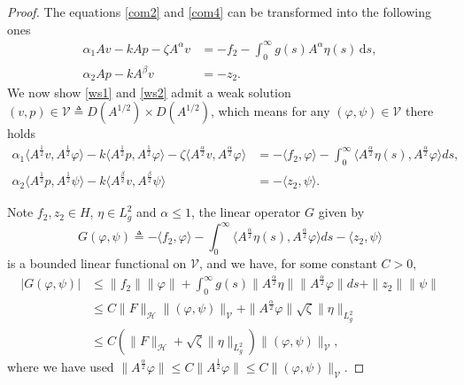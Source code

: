 \documentclass[12pt,reqno]{article}
\begin{document}
\begin{proof}
		The equations \eqref{com2} and \eqref{com4} can be transformed into the following ones
		\begin{align}
			\alpha_1 A v - kA p - \zeta A^\alpha v &= -f_2 - \displaystyle\int_{0}^{\infty} g(s) A^\alpha \eta(s) \, \mathrm{d}s, \label{ws1}\\
			\alpha_2 A p - kA^\beta v &= -z_2\label{ws2}.
		\end{align}
		We now show \eqref{ws1} and \eqref{ws2} admit a weak solution $(v,p)\in \mathcal{V}\triangleq{D}(A^{1/2})\times {D}(A^{1/2})$, which means  for any $(\varphi,\psi)\in\mathcal{V}$ there holds
		\begin{align}
			\alpha_1 \langle A^{\frac{1}{2}}v, A^{\frac{1}{2}}\varphi \rangle
			- k \langle A^{\frac{1}{2}}p, A^{\frac{1}{2}}\varphi \rangle
			- \zeta \langle A^{\frac{\alpha}{2}}v, A^{\frac{\alpha}{2}}\varphi \rangle
			&= -\langle f_2, \varphi \rangle-\int_0^\infty\langle A^{\frac\alpha 2}\eta(s), A^{\frac\alpha 2}\varphi \rangle ds,\label{alpha1} \\
			\alpha_2 \langle A^{\frac{1}{2}}p, A^{\frac{1}{2}}\psi \rangle
			- k \langle A^{\frac{\beta}{2}}v, A^{\frac{\beta}{2}}\psi \rangle
			&= -\langle z_2, \psi \rangle.\label{alpha2}
		\end{align}
		
		Note $f_2,z_2\in H$, $\eta\in L^2_g$ and $\alpha\le1$, the linear operator $G$ given by
		\begin{equation}\label{G}
			G(\varphi,\psi)\triangleq-\langle f_2, \varphi \rangle-\int_0^\infty\langle A^{\frac\alpha 2}\eta(s), A^{\frac\alpha 2}\varphi \rangle ds-\langle z_2, \psi \rangle
		\end{equation}
		is a bounded linear functional on $\mathcal{V}$, and we have, for some constant $C>0$,
		\begin{align*}
			|G(\varphi,\psi)|
			&\leq \|f_2\|\|\varphi\| + \int_0^\infty g(s)\|A^{\frac{\alpha}{2}}\eta\|\|A^{\frac{\alpha}{2}}\varphi\|ds + \|z_2\|\|\psi\| \\
			&\leq C\|F\|_{\mathcal{H}} \|(\varphi,\psi)\|_{\mathcal{V}} + \|A^{\frac{\alpha}{2}}\varphi\|\sqrt{\zeta}\|\eta\|_{L_g^2} \\
			&\leq  C(\|F\|_{\mathcal{H}}+\sqrt{\zeta}\|\eta\|_{L_g^2}) \|(\varphi,\psi)\|_{\mathcal{V}},
		\end{align*}
		where we have used $\|A^{\frac{\alpha}{2}}\varphi\|\le C\|A^{\frac{1}{2}}\varphi\|\le C\|(\varphi,\psi)\|_{\mathcal{V}}$.
		

\end{proof}
\end{document}
